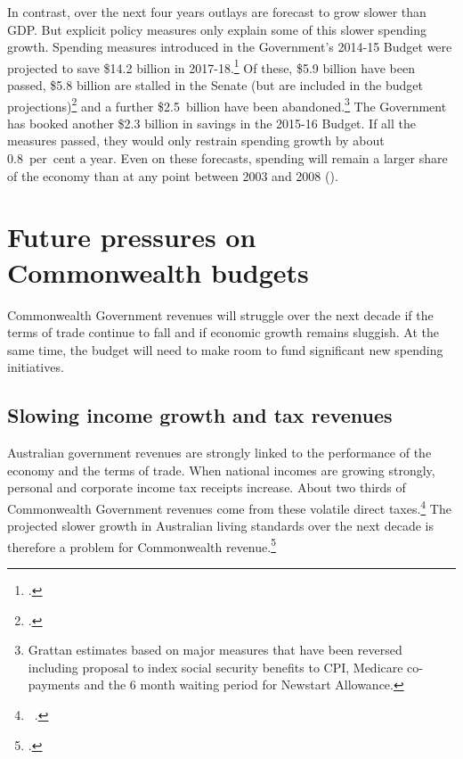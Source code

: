 \documentclass[twoside,english]{palatinob5portrait}
\begin{document}
In contrast, over the next four years outlays are forecast to grow slower than GDP\@. But explicit policy measures only explain some of this slower spending growth. Spending measures introduced in the Government’s 2014-15 Budget were projected to save \$14.2 billion in 2017-18.\footcite[][BP~No.~2, p.~47]{Treasury2015BudgetPapers201516}  Of these, \$5.9 billion have been passed, \$5.8 billion are stalled in the Senate (but are included in the budget projections)\footcite{PBO2015f}  and a further \$2.5~billion have been abandoned.\footnote{Grattan estimates based on major measures that have been reversed including proposal to index social security benefits to CPI, Medicare co-payments and the 6 month waiting period for Newstart Allowance.}  The Government has booked another \$2.3 billion in savings in the 2015-16 Budget. If all the measures passed, they would only restrain spending growth by about 0.8~per~cent a year.  Even on these forecasts, spending will remain a larger share of the economy than at any point between 2003 and 2008 ().

\cleardoubleevenstandardpage
{}
\FloatBarrier
\afterpage{\cleardoublepage}


\chapter{Future pressures on Commonwealth budgets}\label{chapter:FISCAL-3}
Commonwealth Government revenues will struggle over the next decade if the terms of trade continue to fall and if economic growth remains sluggish. At the same time, the budget will need to make room to fund significant new spending initiatives. 

\section{Slowing income growth and tax revenues}\label{sec:FISCAL-3-1}
Australian government revenues are strongly linked to the performance of the economy and the terms of trade. When national incomes are growing strongly, personal and corporate income tax receipts increase. About two thirds of Commonwealth Government revenues come from these volatile direct taxes.\footnote{\gao\ \textcite[][BP~No.~1, pp.~5--18]{Treasury2014-Budget-Papers-2014-15}.}  The projected slower growth in Australian living standards over the next decade is therefore a problem for Commonwealth revenue.\footcite[][vii]{HenryTaxReview2010}
\end{document}
